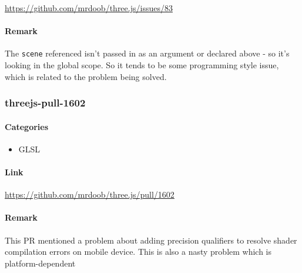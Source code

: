 \url{https://github.com/mrdoob/three.js/issues/83}

\paragraph{Remark}\label{remark-14}

The \texttt{scene} referenced isn't passed in as an argument or declared
above - so it's looking in the global scope. So it tends to be some
programming style issue, which is related to the problem being solved.

\subsubsection{threejs-pull-1602}\label{threejs-pull-1602-1}

\paragraph{Categories}\label{categories-5}

\begin{itemize}
\tightlist
\item
  GLSL
\end{itemize}

\paragraph{Link}\label{link-15}

\url{https://github.com/mrdoob/three.js/pull/1602}

\paragraph{Remark}\label{remark-15}

This PR mentioned a problem about adding precision qualifiers to resolve
shader compilation errors on mobile device. This is also a nasty problem
which is platform-dependent

